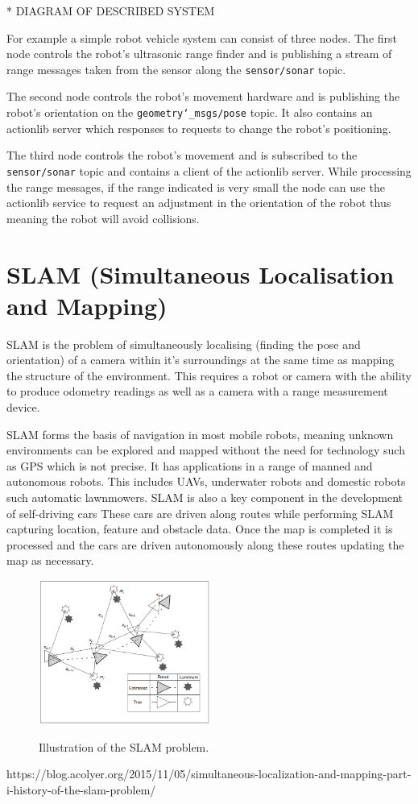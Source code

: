 \documentclass{mproj}
\begin{document}
* DIAGRAM OF DESCRIBED SYSTEM

For example a simple robot vehicle system can consist of three nodes. The first node controls the robot's ultrasonic range finder and is publishing a stream of range messages taken from the sensor along the \texttt{sensor/sonar} topic.

The second node controls the robot's movement hardware and is publishing the robot's orientation on the \texttt{geometry\char`_msgs/pose} topic. It also contains an actionlib server which responses to requests to change the robot's positioning. 

The third node controls the robot's movement and is subscribed to the \texttt{sensor/sonar} topic and contains a client of the actionlib server. While processing the range messages, if the range indicated is very small the node can use the actionlib service to request an adjustment in the orientation of the robot thus meaning the robot will avoid collisions. 



\section{SLAM (Simultaneous Localisation and Mapping)}

SLAM is the problem of simultaneously localising (finding the pose and orientation) of a camera within it's surroundings at the same time as mapping the structure of the environment. This requires a robot or camera with the ability to produce odometry readings as well as a camera with a range measurement device.

SLAM forms the basis of navigation in most mobile robots, meaning unknown environments can be explored and mapped without the need for technology such as GPS which is not precise. It has applications in a range of manned and autonomous robots. This includes UAVs, underwater robots and domestic robots such automatic lawnmowers. SLAM is also a key component in the development of self-driving cars These cars are driven along routes while performing SLAM capturing location, feature and obstacle data. Once the map is completed it is processed and the cars are driven autonomously along these routes updating the map as necessary.


\begin{figure}[h]
  \caption{Illustration of the SLAM problem.}
  \centering
  \includegraphics[width=0.5\textwidth]{images/slam_problem.png}
  \label{fig:SLAM Problem}
\end{figure}
https://blog.acolyer.org/2015/11/05/simultaneous-localization-and-mapping-part-i-history-of-the-slam-problem/
\end{document}
